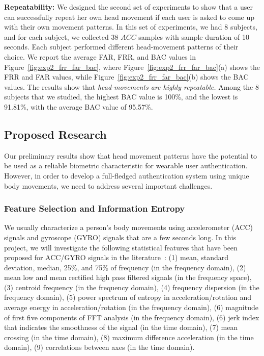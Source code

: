 \vspace{4pt}\textbf{Repeatability:} We designed the second set of experiments to show that a user can successfully repeat her own head movement if each user is asked to come up with their own movement patterns. In this set of experiments, we had 8 subjects, and for each subject, we collected 38 $ACC$ samples with sample duration of 10 seconds. Each subject performed different head-movement patterns of their choice. We report the average FAR, FRR, and BAC values in Figure~\ref{fig:exp2_frr_far_bac}, where Figure~\ref{fig:exp2_frr_far_bac}(a) shows the FRR and FAR values, while Figure~\ref{fig:exp2_frr_far_bac}(b) shows the BAC values. The results show that \emph{head-movements are highly repeatable.} Among the 8 subjects that we studied, the highest BAC value is 100\%, and the lowest is 91.81\%, with the average BAC value of 95.57\%.


\subsection{Proposed Research}
Our preliminary results show that head movement patterns have the potential to be used as a reliable biometric characteristic for wearable user authentication. However, in order to develop a full-fledged authentication system using unique body movements, we need to address several important challenges.

\subsubsection{Feature Selection and Information Entropy}\label{sec:feature}
We usually characterize a person's body movements using accelerometer (ACC) signals and gyroscope (GYRO) signals that are a few seconds long. In this project, we will investigate the following statistical features that have been proposed for ACC/GYRO signals in the literature~\cite{palmerini2011feature,Pirttikangas2006feature,preece2009comparison,bao2004activity,zhang2011feature}: (1) mean, standard deviation, median, 25\%, and 75\% of frequency (in the frequency domain), (2) mean low and mean rectified high pass filtered signals (in the frequency space), (3) centroid frequency (in the frequency domain), (4) frequency dispersion (in the frequency domain), (5) power spectrum of entropy in acceleration/rotation and average energy in acceleration/rotation (in the frequency domain), (6) magnitude of first five components of FFT analysis (in the frequency domain), (6) jerk index that indicates the smoothness of the signal (in the time domain), (7) mean crossing (in the time domain), (8) maximum difference acceleration (in the time domain), (9) correlations between axes (in the time domain).

